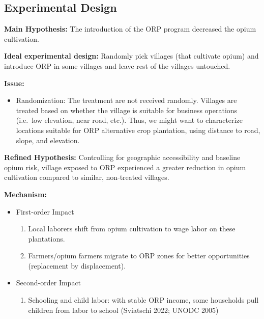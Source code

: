 \documentclass[
  letterpaper,
  DIV=11,
  numbers=noendperiod]{scrartcl}
\providecommand{\tightlist}{%
  \setlength{\itemsep}{0pt}\setlength{\parskip}{0pt}}\usepackage{longtable,booktabs,array}
\begin{document}
\subsection{Experimental Design}\label{experimental-design}

\textbf{Main Hypothesis:} The introduction of the ORP program decreased
the opium cultivation.

\textbf{Ideal experimental design:} Randomly pick villages (that
cultivate opium) and introduce ORP in some villages and leave rest of
the villages untouched.

\textbf{Issue:}

\begin{itemize}
\tightlist
\item
  Randomization: The treatment are not received randomly. Villages are
  treated based on whether the village is suitable for business
  operations (i.e.~low elevation, near road, etc.). Thus, we might want
  to characterize locations suitable for ORP alternative crop
  plantation, using distance to road, slope, and elevation.
\end{itemize}

\textbf{Refined Hypothesis:} Controlling for geographic accessibility
and baseline opium risk, village exposed to ORP experienced a greater
reduction in opium cultivation compared to similar, non-treated
villages.

\textbf{Mechanism:}

\begin{itemize}
\item
  First-order Impact

  \begin{enumerate}
  \def\labelenumi{\arabic{enumi}.}
  \tightlist
  \item
    Local laborers shift from opium cultivation to wage labor on these
    plantations.
  \item
    Farmers/opium farmers migrate to ORP zones for better opportunities
    (replacement by displacement).
  \end{enumerate}
\item
  Second-order Impact

  \begin{enumerate}
  \def\labelenumi{\arabic{enumi}.}
  \tightlist
  \item
    Schooling and child labor: with stable ORP income, some households
    pull children from labor to school (Sviatschi 2022; UNODC 2005)
  \end{enumerate}
\end{itemize}
\end{document}
